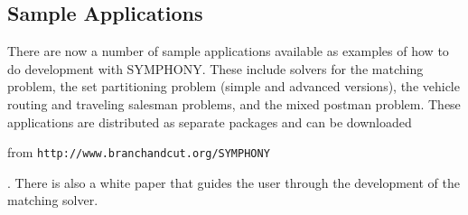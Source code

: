 \subsection{Sample Applications}

There are now a number of sample applications available as examples of how
to do development with SYMPHONY. These include solvers for the matching
problem, the set partitioning problem (simple and advanced versions), the 
vehicle routing and traveling salesman problems, and the mixed postman
problem. These applications are distributed as separate packages and can be
downloaded 	      
\emph{}
\begin{latexonly} 
from \texttt{http://www.branchandcut.org/SYMPHONY}
\end{latexonly}. There is also a white paper that guides the
user through the development of the matching solver.
